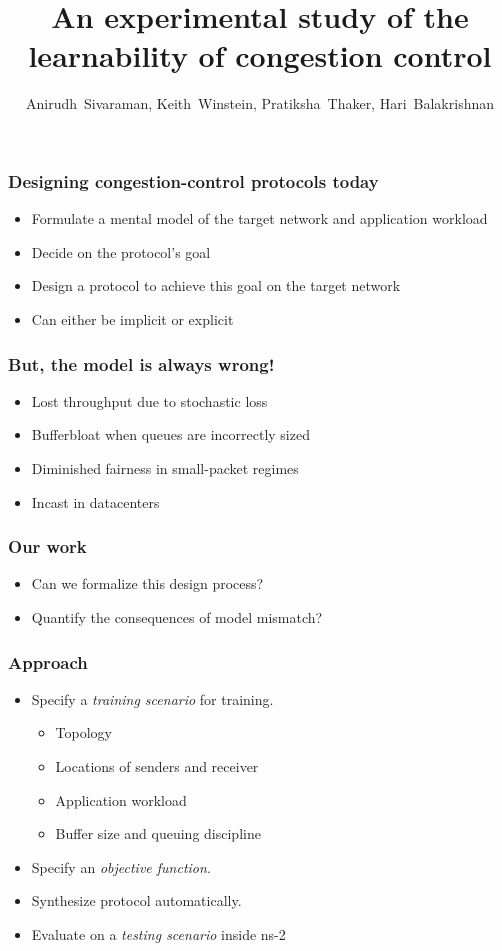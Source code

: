 \documentclass[svgnames]{beamer}
\title{An experimental study of the learnability of congestion control}
\author{Anirudh~Sivaraman, Keith~Winstein, Pratiksha~Thaker, Hari~Balakrishnan}
\institute{MIT CSAIL\vspace{\baselineskip}}
\begin{document}
\begin{frame}

\titlepage

\end{frame}

\begin{Large}
\begin{frame}
\frametitle{Designing congestion-control protocols today}
\begin{itemize}
\item Formulate a mental model of the target network and application workload
\item Decide on the protocol's goal
\item Design a protocol to achieve this goal on the target network
\item Can either be implicit or explicit
\end{itemize}
\end{frame}

\begin{frame}
\frametitle{But, the model is always wrong!}
\begin{itemize}
\item Lost throughput due to stochastic loss 
\item Bufferbloat when queues are incorrectly sized
\item Diminished fairness in small-packet regimes
\item Incast in datacenters
\end{itemize}
\end{frame}

\begin{frame}
\frametitle{Our work}
\begin{itemize}
\item Can we formalize this design process?
\item Quantify the consequences of model mismatch?
\end{itemize}
\end{frame}

\begin{frame}
\frametitle{Approach}
\begin{itemize}
\item Specify a \textit{training scenario} for training.
\begin{itemize}
\item Topology
\item Locations of senders and receiver
\item Application workload
\item Buffer size and queuing discipline 
\end{itemize}
\item Specify an \textit{objective function}.
\item Synthesize protocol automatically.
\item Evaluate on a \textit{testing scenario} inside ns-2
\end{itemize}
\end{frame}


\end{Large}
\end{document}
